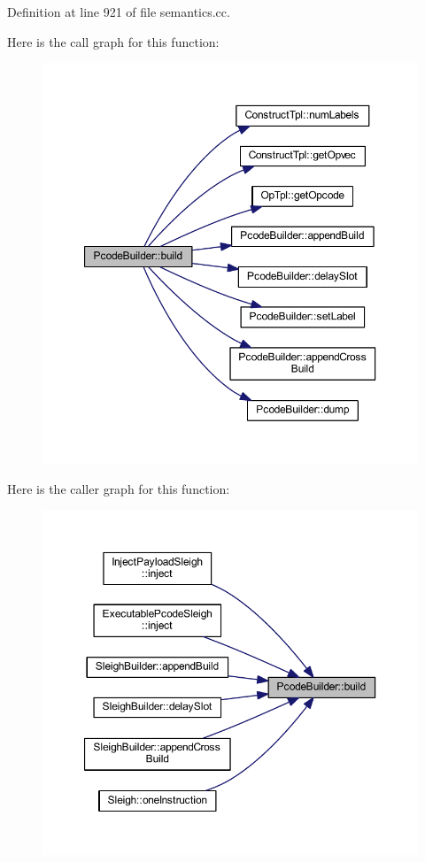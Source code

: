 Definition at line 921 of file semantics.\+cc.

Here is the call graph for this function\+:
\nopagebreak
\begin{figure}[H]
\begin{center}
\leavevmode
\includegraphics[width=350pt]{class_pcode_builder_a0d27ac650805e617aa50c28da6d49c07_cgraph}
\end{center}
\end{figure}
Here is the caller graph for this function\+:
\nopagebreak
\begin{figure}[H]
\begin{center}
\leavevmode
\includegraphics[width=350pt]{class_pcode_builder_a0d27ac650805e617aa50c28da6d49c07_icgraph}
\end{center}
\end{figure}
\mbox{\label{class_pcode_builder_a229a55795ad8c72be40f1d2125751035}} 
